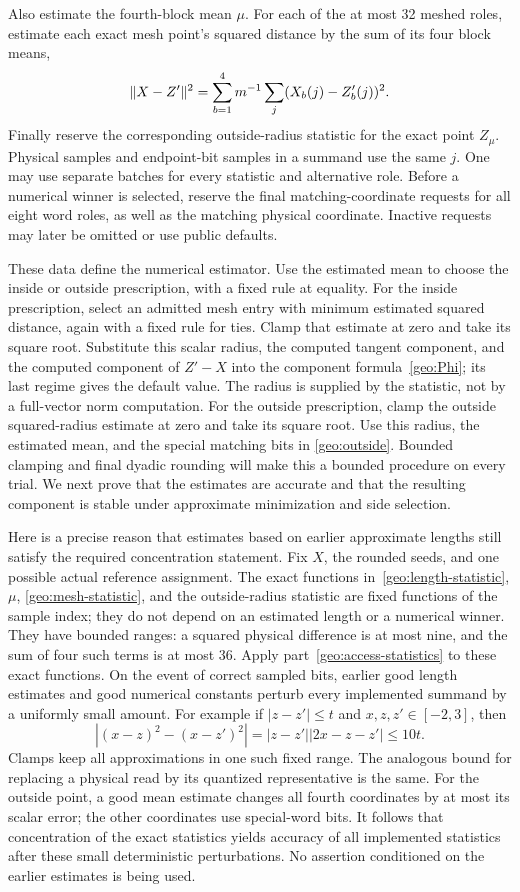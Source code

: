 Also estimate the fourth-block mean $\mu$. For each of the at most
32 meshed roles, estimate each exact mesh point's squared distance by
the sum of its four block means,
\begin{equation}\label{geo:mesh-statistic}
 \lVert X-Z'\rVert^2
   =\sum_{b=1}^4m^{-1}\sum_j(X_b(j)-Z'_b(j))^2.
\end{equation}
Finally reserve the corresponding outside-radius statistic for the
exact point $Z_\mu$. Physical samples and endpoint-bit samples in a
summand use the same $j$. One may use separate batches for every
statistic and alternative role. Before a numerical winner is selected,
reserve the final matching-coordinate requests for all eight word
roles, as well as the matching physical coordinate. Inactive requests
may later be omitted or use public defaults.

These data define the numerical estimator. Use the estimated mean to
choose the inside or outside prescription, with a fixed rule at equality.
For the inside prescription, select an admitted mesh entry with minimum
estimated squared distance, again with a fixed rule for ties. Clamp that
estimate at zero and take its square root. Substitute this scalar radius,
the computed tangent component, and the computed component of $Z'-X$
into the component formula~\eqref{geo:Phi}; its last regime gives the
default value. The radius is supplied by the statistic, not by a
full-vector norm computation. For the outside prescription, clamp the
outside squared-radius estimate at zero and take its square root. Use
this radius, the estimated mean, and the special matching bits in
\eqref{geo:outside}. Bounded clamping and final dyadic rounding
will make this a bounded procedure on every trial. We next prove that
the estimates are accurate and that the resulting component is stable
under approximate minimization and side selection.

Here is a precise reason that estimates based on earlier approximate
lengths still satisfy the required concentration statement. Fix $X$, the
rounded seeds, and one possible actual reference assignment. The exact
functions in~\eqref{geo:length-statistic}, $\mu$,
\eqref{geo:mesh-statistic}, and the outside-radius statistic are fixed
functions of the sample index; they do not depend on an estimated
length or a numerical winner. They have bounded ranges: a squared
physical difference is at most nine, and the sum of four such terms
is at most 36. Apply part~\ref{geo:access-statistics} to these exact
functions. On the event of correct sampled bits, earlier good length
estimates and good numerical constants perturb every implemented
summand by a uniformly small amount. For example if $|z-z'|\le t$
and $x,z,z'\in[-2,3]$, then
\[
 |(x-z)^2-(x-z')^2|
   =|z-z'||2x-z-z'|\le10t.
\]
Clamps keep all approximations in one such fixed range. The analogous
bound for replacing a physical read by its quantized representative
is the same. For the outside point, a good mean estimate changes all
fourth coordinates by at most its scalar error; the other coordinates
use special-word bits. It follows that concentration of the exact
statistics yields accuracy of all implemented statistics after these
small deterministic perturbations. No assertion conditioned on the
earlier estimates is being used.

